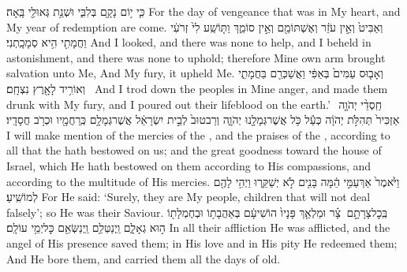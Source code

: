 {כִּ֛י י֥וֹם נָקָ֖ם בְּלִבִּ֑י וּשְׁנַ֥ת גְּאוּלַ֖י בָּֽאָה׃}
{For the day of vengeance that was in My heart, and My year of redemption are come.}
{וְאַבִּיט֙ וְאֵ֣ין עֹזֵ֔ר וְאֶשְׁתּוֹמֵ֖ם וְאֵ֣ין סוֹמֵ֑ךְ וַתּ֤וֹשַֽׁע לִי֙ זְרֹעִ֔י וַחֲמָתִ֖י הִ֥יא סְמָכָֽתְנִי׃}
{And I looked, and there was none to help, and I beheld in astonishment, and there was none to uphold; therefore Mine own arm brought salvation unto Me, And My fury, it upheld Me.}
{וְאָב֤וּס עַמִּים֙ בְּאַפִּ֔י וַאֲשַׁכְּרֵ֖ם בַּחֲמָתִ֑י וְאוֹרִ֥יד לָאָ֖רֶץ נִצְחָֽם׃ \setuma }
{And I trod down the peoples in Mine anger, and made them drunk with My fury, and I poured out their lifeblood on the earth.’}
{חַֽסְדֵ֨י יְהֹוָ֤ה \pasek  אַזְכִּיר֙ תְּהִלֹּ֣ת יְהֹוָ֔ה כְּעַ֕ל כֹּ֥ל אֲשֶׁר\maqqaf גְּמָלָ֖נוּ יְהֹוָ֑ה וְרַב\maqqaf טוּב֙ לְבֵ֣ית יִשְׂרָאֵ֔ל אֲשֶׁר\maqqaf גְּמָלָ֥ם כְּֽרַחֲמָ֖יו וּכְרֹ֥ב חֲסָדָֽיו׃}
{I will make mention of the mercies of the \lord, and the praises of the \lord, according to all that the \lord\space hath bestowed on us; and the great goodness toward the house of Israel, which He hath bestowed on them according to His compassions, and according to the multitude of His mercies.}
{וַיֹּ֙אמֶר֙ אַךְ\maqqaf עַמִּ֣י הֵ֔מָּה בָּנִ֖ים לֹ֣א יְשַׁקֵּ֑רוּ וַיְהִ֥י לָהֶ֖ם לְמוֹשִֽׁיעַ׃}
{For He said: ‘Surely, they are My people, children that will not deal falsely’; so He was their Saviour.}
{בְּֽכׇל\maqqaf צָרָתָ֣ם \legarmeh  {} צָ֗ר וּמַלְאַ֤ךְ פָּנָיו֙ הוֹשִׁיעָ֔ם בְּאַהֲבָת֥וֹ וּבְחֶמְלָת֖וֹ ה֣וּא גְאָלָ֑ם וַֽיְנַטְּלֵ֥ם וַֽיְנַשְּׂאֵ֖ם כׇּל\maqqaf יְמֵ֥י עוֹלָֽם׃}
{In all their affliction He was afflicted, and the angel of His presence saved them; in His love and in His pity He redeemed them; And He bore them, and carried them all the days of old.}